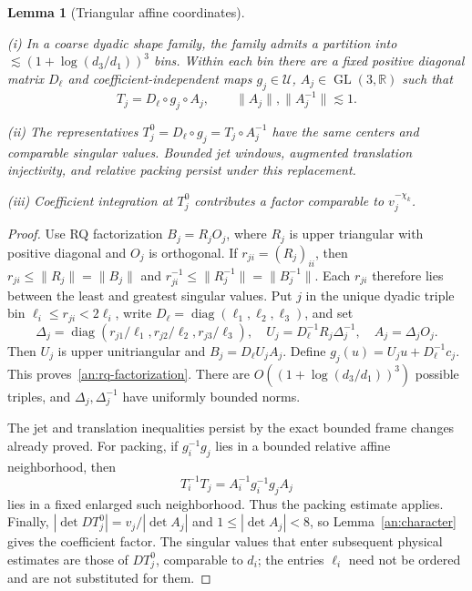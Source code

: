 \documentclass[11pt]{amsart}
\newtheorem{lemma}[theorem]{Lemma}
\theoremstyle{definition}
\theoremstyle{remark}
\numberwithin{equation}{section}
\begin{document}
\begin{lemma}[Triangular affine coordinates]\label{an:rq}

\leavevmode\noindent\textup{(i)} In a coarse dyadic shape family, the family admits a partition into $\lesssim(1+\log(d_3/d_1))^3$ bins. Within each bin there are a fixed positive diagonal matrix $D_\ell$ and coefficient-independent maps $g_j\in\mathcal U$, $A_j\in\operatorname{GL}(3,\mathbb R)$ such that
\begin{equation}\label{an:rq-factorization}
T_j=D_\ell\circ g_j\circ A_j,\qquad \|A_j\|,\|A_j^{-1}\|\lesssim 1.
\end{equation}

\noindent\textup{(ii)} The representatives $T_j^0=D_\ell\circ g_j=T_j\circ A_j^{-1}$ have the same centers and comparable singular values. Bounded jet windows, augmented translation injectivity, and relative packing persist under this replacement.

\noindent\textup{(iii)} Coefficient integration at $T_j^0$ contributes a factor comparable to $v_j^{-\chi_k}$.
\end{lemma}
\begin{proof}
Use RQ factorization $B_j=R_jO_j$, where $R_j$ is upper triangular with positive diagonal and $O_j$ is orthogonal. If $r_{ji}=(R_j)_{ii}$, then $r_{ji}\le\|R_j\|=\|B_j\|$ and $r_{ji}^{-1}\le\|R_j^{-1}\|=\|B_j^{-1}\|$. Each $r_{ji}$ therefore lies between the least and greatest singular values. Put $j$ in the unique dyadic triple bin $\ell_i\le r_{ji}<2\ell_i$, write $D_\ell=\operatorname{diag}(\ell_1,\ell_2,\ell_3)$, and set
\[
\Delta_j=\operatorname{diag}(r_{j1}/\ell_1,r_{j2}/\ell_2,r_{j3}/\ell_3),\quad U_j=D_\ell^{-1}R_j\Delta_j^{-1},\quad A_j=\Delta_jO_j.
\]
Then $U_j$ is upper unitriangular and $B_j=D_\ell U_jA_j$. Define $g_j(u)=U_ju+D_\ell^{-1}c_j$. This proves~\eqref{an:rq-factorization}. There are $O((1+\log(d_3/d_1))^3)$ possible triples, and $\Delta_j,\Delta_j^{-1}$ have uniformly bounded norms.

The jet and translation inequalities persist by the exact bounded frame changes already proved. For packing, if $g_i^{-1}g_j$ lies in a bounded relative affine neighborhood, then
\[
T_i^{-1}T_j=A_i^{-1}g_i^{-1}g_jA_j
\]
lies in a fixed enlarged such neighborhood. Thus the packing estimate applies. Finally, $|\det DT_j^0|=v_j/|\det A_j|$ and $1\le|\det A_j|<8$, so Lemma~\ref{an:character} gives the coefficient factor. The singular values that enter subsequent physical estimates are those of $DT_j^0$, comparable to $d_i$; the entries $\ell_i$ need not be ordered and are not substituted for them.
\end{proof}
\end{document}
